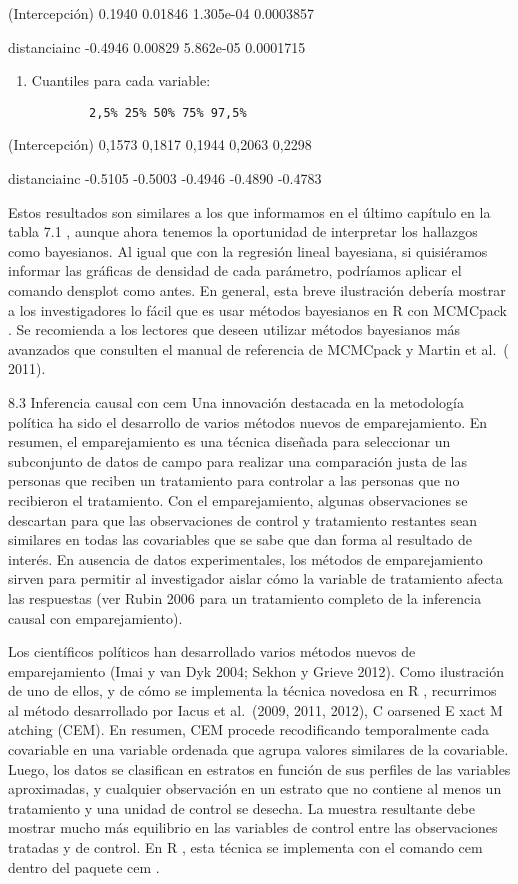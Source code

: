 \documentclass[
]{book}
\begin{document}
(Intercepción) 0.1940 0.01846 1.305e-04 0.0003857

distanciainc -0.4946 0.00829 5.862e-05 0.0001715

\begin{enumerate}
\def\labelenumi{\arabic{enumi}.}
\setcounter{enumi}{1}
\item
  Cuantiles para cada variable:

\begin{verbatim}
        2,5% 25% 50% 75% 97,5%
\end{verbatim}
\end{enumerate}

(Intercepción) 0,1573 0,1817 0,1944 0,2063 0,2298

distanciainc -0.5105 -0.5003 -0.4946 -0.4890 -0.4783

Estos resultados son similares a los que informamos en el último capítulo en la tabla 7.1 , aunque ahora tenemos la oportunidad de interpretar los hallazgos como bayesianos. Al igual que con la regresión lineal bayesiana, si quisiéramos informar las gráficas de densidad de cada parámetro, podríamos aplicar el comando densplot como antes. En general, esta breve ilustración debería mostrar a los investigadores lo fácil que es usar métodos bayesianos en R con MCMCpack . Se recomienda a los lectores que deseen utilizar métodos bayesianos más avanzados que consulten el manual de referencia de MCMCpack y Martin et al.~( 2011).

8.3 Inferencia causal con cem
Una innovación destacada en la metodología política ha sido el desarrollo de varios métodos nuevos de emparejamiento. En resumen, el emparejamiento es una técnica diseñada para seleccionar un subconjunto de datos de campo para realizar una comparación justa de las personas que reciben un tratamiento para controlar a las personas que no recibieron el tratamiento. Con el emparejamiento, algunas observaciones se descartan para que las observaciones de control y tratamiento restantes sean similares en todas las covariables que se sabe que dan forma al resultado de interés. En ausencia de datos experimentales, los métodos de emparejamiento sirven para permitir al investigador aislar cómo la variable de tratamiento afecta las respuestas (ver Rubin 2006 para un tratamiento completo de la inferencia causal con emparejamiento).

Los científicos políticos han desarrollado varios métodos nuevos de emparejamiento (Imai y van Dyk 2004; Sekhon y Grieve 2012). Como ilustración de uno de ellos, y de cómo se implementa la técnica novedosa en R , recurrimos al método desarrollado por Iacus et al.~(2009, 2011, 2012), C oarsened E xact M atching (CEM). En resumen, CEM procede recodificando temporalmente cada covariable en una variable ordenada que agrupa valores similares de la covariable. Luego, los datos se clasifican en estratos en función de sus perfiles de las variables aproximadas, y cualquier observación en un estrato que no contiene al menos un tratamiento y una unidad de control se desecha. La muestra resultante debe mostrar mucho más equilibrio en las variables de control entre las observaciones tratadas y de control. En R , esta técnica se implementa con el comando cem dentro del paquete cem .
\end{document}
